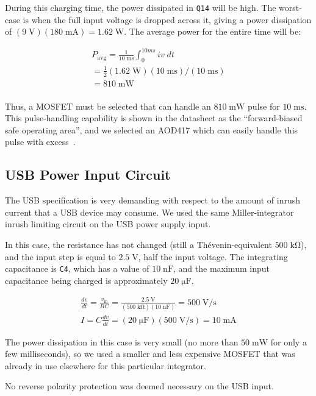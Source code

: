 \documentclass[article]{memoir}
\newcommand{\refdes}[1]{\texttt{#1}}
\newcommand{\mr}[1]{\ensuremath{\mathrm{#1}}}
\begin{document}
\begin{multicols}{2}
During this charging time, the power dissipated in \texttt{Q14} will be high.
The worst-case is when the full input voltage is dropped across it, giving
a power dissipation of $(9\;\mr{V})(180\;\mr{mA}) = 1.62\;\mr{W}$. The average
power for the entire time will be:

\begin{gather*}
    P_\mr{avg} = \frac{1}{10\;\mr{ms}}\int_0^{10ms} iv\;dt \\
    {}= \tfrac{1}{2}(1.62\;\mr{W})(10\;\mr{ms})/(10\;\mr{ms}) \\
    {}= 810\;\mr{mW} \\
\end{gather*}

Thus, a MOSFET must be selected that can handle an $810\;\mr{mW}$ pulse for
$10\;\mr{ms}$. This pulse-handling capability is shown in the datasheet as
the ``forward-biased safe operating area'', and we selected an AOD417 which
can easily handle this pulse with excess~\cite{aod417}.


\subsection{USB Power Input Circuit}

The USB specification is very demanding with respect to the amount of inrush
current that a USB device may consume. We used the same Miller-integrator
inrush limiting circuit on the USB power supply input.

In this case, the resistance has not changed (still a Th\'evenin-equivalent
$500\;\mr{k\Omega}$), and the input step is equal to $2.5\;\mr{V}$, half the
input voltage. The integrating capacitance is \refdes{C4}, which has a value of $10\;\mr{nF}$,
and the maximum input capacitance being charged is approximately $20\;\mr{\mu F}$.

\begin{gather*}
    \frac{dv}{dt} = \frac{v_\mr{in}}{RC} = \frac{2.5\;\mr{V}}{(500\;\mr{k\Omega})(10\;\mr{nF})}
    = 500\;\mr{V/s} \\
    I = C \frac{dv}{dt} = (20\;\mr{\mu F})(500\;\mr{V/s}) = 10\;\mr{mA}
\end{gather*}

The power dissipation in this case is very small (no more than $50\;\mr{mW}$ for
only a few milliseconds), so we used a smaller and less expensive MOSFET that
was already in use elsewhere for this particular integrator.

No reverse polarity protection was deemed necessary on the USB input.


\end{multicols}
\end{document}
